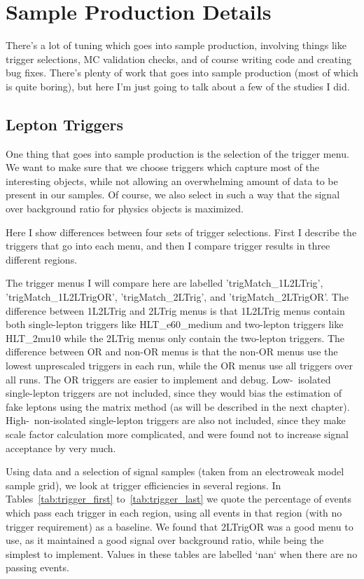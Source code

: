 \chapter{Sample Production Details}

There's a lot of tuning which goes into sample production, involving things like trigger selections, MC validation checks, and of course writing code and creating bug fixes. There's plenty of work that goes into sample production (most of which is quite boring), but here I'm just going to talk about a few of the studies I did.

\section{Lepton Triggers}

One thing that goes into sample production is the selection of the trigger menu. We want to make sure that we choose triggers which capture most of the interesting objects, while not allowing an overwhelming amount of data to be present in our samples. Of course, we also select in such a way that the signal over background ratio for physics objects is maximized.

Here I show differences between four sets of trigger selections. First I describe the triggers that go into each menu, and then I compare trigger results in three different regions.

The trigger menus I will compare here are labelled 'trigMatch\_1L2LTrig', 'trigMatch\_1L2LTrigOR', 'trigMatch\_2LTrig', and 'trigMatch\_2LTrigOR'. The difference between 1L2LTrig and 2LTrig menus is that 1L2LTrig menus contain both single-lepton triggers like HLT\_e60\_medium and two-lepton triggers like HLT\_2mu10 while the 2LTrig menus only contain the two-lepton triggers. The difference between OR and non-OR menus is that the non-OR menus use the lowest unprescaled triggers in each run, while the OR menus use all triggers over all runs. The OR triggers are easier to implement and debug. Low-\pt\ isolated single-lepton triggers are not included, since they would bias the estimation of fake leptons using the matrix method (as will be described in the next chapter). High-\pt\ non-isolated single-lepton triggers are also not included, since they make scale factor calculation more complicated, and were found not to increase signal acceptance by very much.

Using data and a selection of signal samples (taken from an electroweak model sample grid), we look at trigger efficiencies in several regions. In Tables~\ref{tab:trigger_first} to~\ref{tab:trigger_last} we quote the percentage of events which pass each trigger in each region, using all events in that region (with no trigger requirement) as a baseline. We found that 2LTrigOR was a good menu to use, as it maintained a good signal over background ratio, while being the simplest to implement. Values in these tables are labelled `nan` when there are no passing events.

